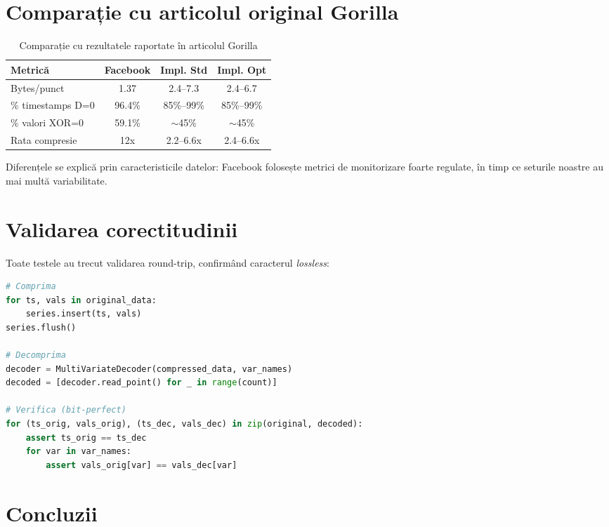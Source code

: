 \section{Comparație cu articolul original Gorilla}

\begin{table}[h]
\centering
\begin{tabular}{@{}lccc@{}}
\toprule
\textbf{Metrică} & \textbf{Facebook} & \textbf{Impl. Std} & \textbf{Impl. Opt} \\
\midrule
Bytes/punct & 1.37 & 2.4--7.3 & 2.4--6.7 \\
\% timestamps D=0 & 96.4\% & 85\%--99\% & 85\%--99\% \\
\% valori XOR=0 & 59.1\% & $\sim$45\% & $\sim$45\% \\
Rata compresie & 12x & 2.2--6.6x & 2.4--6.6x \\
\bottomrule
\end{tabular}
\caption{Comparație cu rezultatele raportate în articolul Gorilla}
\label{tab:comparison-original}
\end{table}

Diferențele se explică prin caracteristicile datelor: Facebook folosește metrici de monitorizare foarte regulate, în timp ce seturile noastre au mai multă variabilitate.

\section{Validarea corectitudinii}

Toate testele au trecut validarea round-trip, confirmând caracterul \textit{lossless}:

\begin{lstlisting}[language=Python, caption={Verificare round-trip}]
# Comprima
for ts, vals in original_data:
    series.insert(ts, vals)
series.flush()

# Decomprima
decoder = MultiVariateDecoder(compressed_data, var_names)
decoded = [decoder.read_point() for _ in range(count)]

# Verifica (bit-perfect)
for (ts_orig, vals_orig), (ts_dec, vals_dec) in zip(original, decoded):
    assert ts_orig == ts_dec
    for var in var_names:
        assert vals_orig[var] == vals_dec[var]
\end{lstlisting}

\section{Concluzii}

